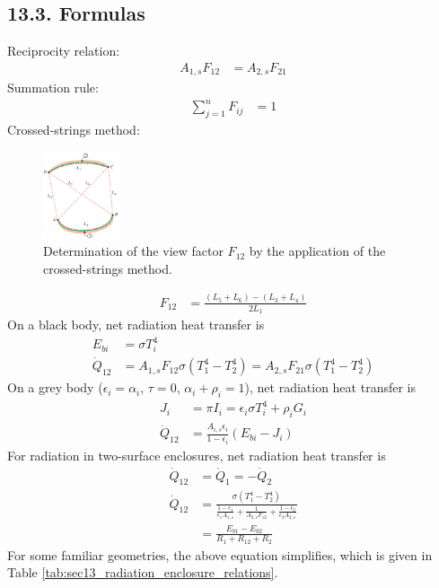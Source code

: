 \begin{multicols*}{2}
\subsection*{13.3. Formulas}
Reciprocity relation:
\begin{align*}
    A_{1, s} F_{12} &= A_{2, s} F_{21} 
\end{align*}
Summation rule:
\begin{align*}
    \sum_{j=1}^n F_{ij} &= 1 
\end{align*}
Crossed-strings method:
\begin{figure}[H]
    \centering
    \includegraphics[width=0.2\textwidth]{Figures/Sec13 crossed strings.png}
    \caption{Determination of the view factor $F_{12}$ by the application of the crossed-strings method.}
    \label{fig:sec13_crossed_strings}
\end{figure}
\begin{align*}
    F_{12} &= \frac{(L_5 + L_6) - (L_3 + L_4)}{2 L_1} 
\end{align*}
On a black body, net radiation heat transfer is
\begin{align*}
    E_{bi} &= \sigma T_i^4 \\
    \dot{Q}_{12} &= A_{1, s} F_{12} \sigma (T_1^4 - T_2^4) = A_{2, s} F_{21} \sigma (T_1^4 - T_2^4) 
\end{align*}
On a grey body ($\epsilon_i = \alpha_i$, $\tau = 0$, $\alpha_i + \rho_i =1$), net radiation heat transfer is
\begin{align*}
    J_i &= \pi I_i = \epsilon_i \sigma T_i^4 + \rho_i G_i \\
    \dot{Q}_{12} &= \frac{A_{i, s} \epsilon_{i}}{1 - \epsilon_i} (E_{bi} - J_i) 
\end{align*}
For radiation in two-surface enclosures, net radiation heat transfer is
\begin{align*}
    \dot{Q}_{12} &= \dot{Q}_{1} = -\dot{Q}_{2} \\
    \dot{Q}_{12} &= \frac{\sigma (T_{1}^4 - T_{2}^4)}{\frac{1- \epsilon_1}{\epsilon_1 A_{1, s}} + \frac{1}{A_{2, s} F_{12}} + \frac{1-\epsilon_2}{\epsilon_2 A_{2, s}}} \\
    &= \frac{E_{b1} - E_{b2}}{R_{1} + R_{12} + R_{2}} 
\end{align*}
For some familiar geometries, the above equation simplifies, which is given in Table \ref{tab:sec13_radiation_enclosure_relations}.
\end{multicols*}

